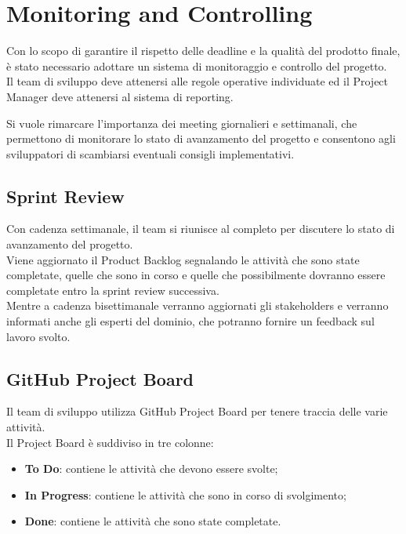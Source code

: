 \section{Monitoring and Controlling}
Con lo scopo di garantire il rispetto delle deadline e la qualità del prodotto finale, è stato necessario adottare un sistema di monitoraggio e controllo del progetto.\\

Il team di sviluppo deve attenersi alle regole operative individuate ed il Project Manager deve attenersi al sistema di reporting.

Si vuole rimarcare l'importanza dei meeting giornalieri e settimanali, che permettono di monitorare lo stato di avanzamento del progetto e consentono agli sviluppatori di scambiarsi eventuali consigli implementativi.\\



\subsection{Sprint Review}
Con cadenza settimanale, il team si riunisce al completo per discutere lo stato di avanzamento del progetto.\\

Viene aggiornato il Product Backlog segnalando le attività che sono state completate, quelle che sono in corso e quelle che possibilmente dovranno essere completate entro la sprint review successiva.\\

Mentre a cadenza bisettimanale verranno aggiornati gli stakeholders e verranno informati anche gli esperti del dominio, che potranno fornire un feedback sul lavoro svolto.\\

\subsection{GitHub Project Board}
Il team di sviluppo utilizza GitHub Project Board per tenere traccia delle varie attività.\\

Il Project Board è suddiviso in tre colonne:
\begin{itemize}
    \item \textbf{To Do}: contiene le attività che devono essere svolte;
    \item \textbf{In Progress}: contiene le attività che sono in corso di svolgimento;
    \item \textbf{Done}: contiene le attività che sono state completate.
\end{itemize}

